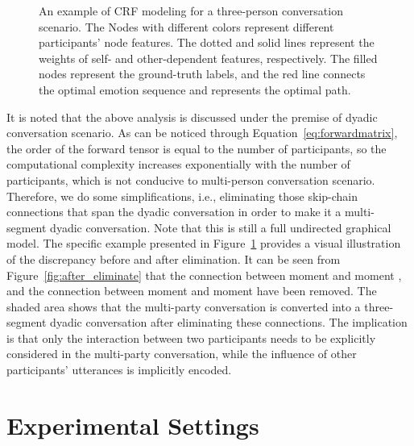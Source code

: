\documentclass{SCIS2019}
\begin{document}
\begin{figure}[htbp]
	\centering
	\captionsetup[subfigure]{}
	\caption{An example of CRF modeling for a three-person conversation scenario. The Nodes with different colors represent different participants' node features. The dotted and solid lines represent the weights of self- and other-dependent features, respectively. The filled nodes represent the ground-truth labels, and the red line connects the optimal emotion sequence and represents the optimal path.}
	\label{fig:skipchain_eliminate}
\end{figure}
It is noted that the above analysis is discussed under the premise of dyadic conversation scenario. As can be noticed through Equation~\ref{eq:forwardmatrix}, the order of the forward tensor is equal to the number of participants, so the computational complexity increases exponentially with the number of participants, which is not conducive to multi-person conversation scenario. Therefore, we do some simplifications, i.e., eliminating those skip-chain connections that span the dyadic conversation in order to make it a multi-segment dyadic conversation. Note that this is still a full undirected graphical model. The specific example presented in Figure~\ref{fig:skipchain_eliminate} provides a visual illustration of the discrepancy before and after elimination. It can be seen from Figure~\ref{fig:after_eliminate} that the connection between moment  and moment , and the connection between moment  and moment  have been removed. The shaded area shows that the multi-party conversation is converted into a three-segment dyadic conversation after eliminating these connections. The implication is that only the interaction between two participants needs to be explicitly considered in the multi-party conversation, while the influence of other participants' utterances is implicitly encoded.

\section{Experimental Settings}\label{sec:experimental_settings}
\end{document}

